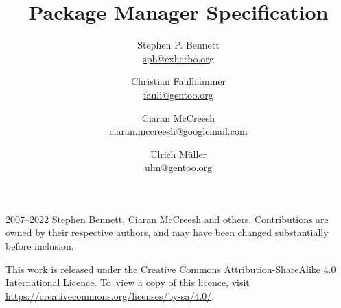 \documentclass{pms}
\title{Package Manager Specification}
\author{%
    Stephen P. Bennett \\
    \href{mailto:spb@exherbo.org}{spb@exherbo.org}
    \and
    Christian Faulhammer \\
    \href{mailto:fauli@gentoo.org}{fauli@gentoo.org}
    \and
    Ciaran McCreesh \\
    \href{mailto:ciaran.mccreesh@googlemail.com}{ciaran.mccreesh@googlemail.com}
    \and
    Ulrich Müller \\
    \href{mailto:ulm@gentoo.org}{ulm@gentoo.org}
}
\begin{document}
\maketitle

\thispagestyle{empty}
\vspace*{\fill}
{%
    \small
    \textcopyright{} 2007--2022 Stephen Bennett, Ciaran McCreesh and others. Contributions are owned
    by their respective authors, and may have been changed substantially before inclusion.

    This work is released under the Creative Commons Attribution-ShareAlike 4.0 International
    Licence. To~view a copy of this licence, visit
    \url{https://creativecommons.org/licenses/by-sa/4.0/}.

    \commitinfo
}

\tableofcontents
\listofalgorithms
\listoflistings
\listoftables



















\appendix
\setcounter{secnumdepth}{0}



\end{document}
